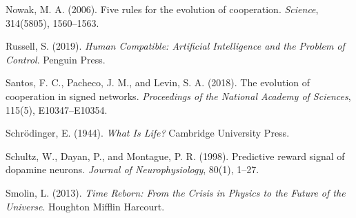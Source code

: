 \documentclass[11pt,a4paper]{article}
\begin{document}
\begin{thebibliography}{}
 Nowak, M. A. (2006). Five rules for the evolution of cooperation. \textit{Science}, 314(5805), 1560--1563.

 Russell, S. (2019). \textit{Human Compatible: Artificial Intelligence and the Problem of Control}. Penguin Press.

 Santos, F. C., Pacheco, J. M., and Levin, S. A. (2018). The evolution of cooperation in signed networks. \textit{Proceedings of the National Academy of Sciences}, 115(5), E10347--E10354.

 Schrödinger, E. (1944). \textit{What Is Life?} Cambridge University Press.

 Schultz, W., Dayan, P., and Montague, P. R. (1998). Predictive reward signal of dopamine neurons. \textit{Journal of Neurophysiology}, 80(1), 1--27.

 Smolin, L. (2013). \textit{Time Reborn: From the Crisis in Physics to the Future of the Universe}. Houghton Mifflin Harcourt.

\end{thebibliography}
\end{document}
